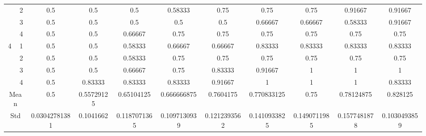 \documentclass[draft,dvipsnames]{drexel-thesis}
\begin{document}
\begin{thesis}
\begin{table}[!t]
{\begin{tabular}{|c|c|c|c|c|c|c|c|c|c|c|}
                      & 2                   & 0.5           & 0.5        & 0.5          & 0.58333      & 0.75         & 0.75         & 0.75         & 0.91667      & 0.91667      \\ \cline{2-11}
                      & 3                   & 0.5           & 0.5        & 0.5          & 0.5          & 0.5          & 0.66667      & 0.66667      & 0.58333      & 0.91667      \\ \cline{2-11}
                      & 4                   & 0.5           & 0.5        & 0.66667      & 0.75         & 0.75         & 0.75         & 0.75         & 0.75         & 0.75         \\ \hline
\multirow{4}{*}{4}    & 1                   & 0.5           & 0.5        & 0.58333      & 0.66667      & 0.66667      & 0.83333      & 0.83333      & 0.83333      & 0.83333      \\ \cline{2-11}
                      & 2                   & 0.5           & 0.5        & 0.58333      & 0.75         & 0.75         & 0.75         & 0.75         & 0.75         & 0.75         \\ \cline{2-11}
                      & 3                   & 0.5           & 0.5        & 0.66667      & 0.75         & 0.83333      & 0.91667      & 1            & 1            & 1            \\ \cline{2-11}
                      & 4                   & 0.5           & 0.83333    & 0.83333      & 0.83333      & 0.91667      & 1            & 1            & 1            & 0.83333      \\ \hline
\multicolumn{2}{|c|}{Mean}                  & 0.5           & 0.55729125 & 0.65104125   & 0.666666875  & 0.7604175    & 0.770833125  & 0.75         & 0.78124875   & 0.828125     \\ \hline
\multicolumn{2}{|c|}{Std}                   & 0.03042781381 & 0.1041662  & 0.1187071365 & 0.1097130939 & 0.1212393562 & 0.1410933825 & 0.1490711985 & 0.1577481878 & 0.1030493859 \\ \hline
\end{tabular}}
\end{table}


\end{thesis}
\end{document}
